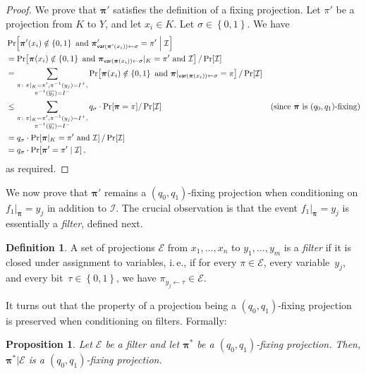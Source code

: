 \documentclass[11pt]{article}
\numberwithin{equation}{section}
\newtheorem{proposition}[theorem]{Proposition}
\theoremstyle{definition}
\newtheorem{definition}[theorem]{Definition}
\theoremstyle{plain}
\newcommand{\ie}{i.\,e.}
\theoremstyle{definition}\newtheorem{notation}[theorem]{Notation}\theoremstyle{plain}
\newcommand{\B}{\left\{ 0,1 \right \}}
\newcommand{\p}{\boldsymbol{\pi}}
\newcommand{\cE}{\mathcal{E}}
\newcommand{\cI}{\mathcal{I}}
\newcommand{\var}{\mathsf{var}}
\theoremstyle{definition}
\theoremstyle{plain}
\begin{document}
\begin{proof}
We prove that $\p'$ satisfies the definition of a fixing projection.
Let $\pi'$ be a projection from $K$ to $Y$, and let $x_{i}\in K$.
Let $\sigma\in\B$. We have 
\begin{align*}
 & \Pr\!\left[\p'(x_{i})\notin\B\text{ and }\p'_{\var(\p'(x_{i}))\gets\sigma}=\pi'\;\middle|\;\cI\right]\\
 & =\Pr\!\left[\p(x_{i})\notin\B\text{ and }\p_{\var(\p(x_{i}))\gets\sigma}|_{K}=\pi'\text{ and }\cI\right]/\Pr\!\left[\cI\right]\\
 & =\sum_{\substack{\pi\colon\pi|_{K}=\pi',\pi^{-1}(y_{j})=I^{+},\\
\pi^{-1}(\overline{y_{j}})=I^{-}
}
}\Pr\!\left[\p(x_{i})\notin\B\text{ and }\p|_{\var(\p(x_{i}))\gets\sigma}=\pi\right]/\Pr\!\left[\cI\right]\\
 & \le\sum_{\substack{\pi\colon\pi|_{K}=\pi',\pi^{-1}(y_{j})=I^{+},\\
\pi^{-1}(\overline{y_{j}})=I^{-}
}
}q_{\sigma}\cdot\Pr[\p=\pi]/\Pr\!\left[\cI\right] & \text{(since \ensuremath{\p} is \ensuremath{(q_{0},q_{1})}-fixing)}\\
 & =q_{\sigma}\cdot\Pr\!\left[\p|_{K}=\pi'\text{ and }\cI\right]/\Pr\!\left[\cI\right]\\
 & =q_{\sigma}\cdot\Pr\!\left[\p'=\pi'\mid\cI\right],
\end{align*}
as required. 
\end{proof}
We now prove that $\p'$ remains a $(q_{0},q_{1})$-fixing projection
when conditioning on $f_{1}|_{\p}=y_{j}$ in addition to $\cI$. The
crucial observation is that the event $f_{1}|_{\p}=y_{j}$ is essentially
a \emph{filter}, defined next. 
\begin{definition}
A set of projections $\cE$ from $x_{1},\ldots,x_{n}$ to $y_{1},\ldots,y_{m}$
is a \emph{filter} if it is closed under assignment to variables,
\ie, if for every $\pi\in\cE$, every variable~$y_{j}$, and every
bit~$\tau\in\B$, we have $\pi_{y_{j}\gets\tau}\in\cE$. 
\end{definition}

It turns out that the property of a projection being a $(q_{0},q_{1})$-fixing
projection is preserved when conditioning on filters. Formally: 
\begin{proposition}
\label{prop:conditioning-on-a-filter}Let $\cE$ be a filter and let $\p^{*}$
be a $(q_{0},q_{1})$-fixing projection. Then, $\p^{*}|\cE$ is a
$(q_{0},q_{1})$-fixing projection. 
\end{proposition}
\end{document}
